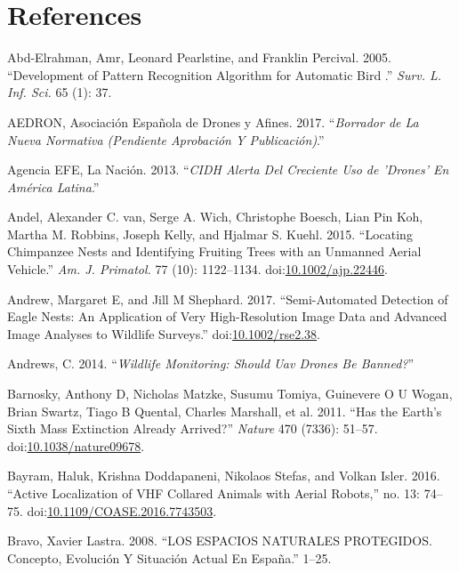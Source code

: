 \documentclass[]{interact}
\theoremstyle{plain}%
\theoremstyle{definition}
\theoremstyle{remark}
\begin{document}
\section*{References}\label{references}

\hypertarget{refs}{}
\hypertarget{ref-abd-elrahman_development_2005}{}
Abd-Elrahman, Amr, Leonard Pearlstine, and Franklin Percival. 2005.
``Development of Pattern Recognition Algorithm for Automatic Bird .''
\emph{Surv. L. Inf. Sci.} 65 (1): 37.

\hypertarget{ref-Aedron2017}{}
AEDRON, Asociación Española de Drones y Afines. 2017. ``\emph{Borrador
de La Nueva Normativa (Pendiente Aprobación Y Publicación)}.''

\hypertarget{ref-Nacion2013}{}
Agencia EFE, La Nación. 2013. ``\emph{CIDH Alerta Del Creciente Uso de
'Drones' En América Latina}.''

\hypertarget{ref-van_andel_locating_2015}{}
Andel, Alexander C. van, Serge A. Wich, Christophe Boesch, Lian Pin Koh,
Martha M. Robbins, Joseph Kelly, and Hjalmar S. Kuehl. 2015. ``Locating
Chimpanzee Nests and Identifying Fruiting Trees with an Unmanned Aerial
Vehicle.'' \emph{Am. J. Primatol.} 77 (10): 1122--1134.
doi:\href{https://doi.org/10.1002/ajp.22446}{10.1002/ajp.22446}.

\hypertarget{ref-andrew_semi-automated_2017}{}
Andrew, Margaret E, and Jill M Shephard. 2017. ``Semi-Automated
Detection of Eagle Nests: An Application of Very High-Resolution Image
Data and Advanced Image Analyses to Wildlife Surveys.''
doi:\href{https://doi.org/10.1002/rse2.38}{10.1002/rse2.38}.

\hypertarget{ref-Andrews2014}{}
Andrews, C. 2014. ``\emph{Wildlife Monitoring: Should Uav Drones Be
Banned?}''

\hypertarget{ref-barnosky_has_2011}{}
Barnosky, Anthony D, Nicholas Matzke, Susumu Tomiya, Guinevere O U
Wogan, Brian Swartz, Tiago B Quental, Charles Marshall, et al. 2011.
``Has the Earth's Sixth Mass Extinction Already Arrived?'' \emph{Nature}
470 (7336): 51--57.
doi:\href{https://doi.org/10.1038/nature09678}{10.1038/nature09678}.

\hypertarget{ref-bayram_active_2016}{}
Bayram, Haluk, Krishna Doddapaneni, Nikolaos Stefas, and Volkan Isler.
2016. ``Active Localization of VHF Collared Animals with Aerial
Robots,'' no. 13: 74--75.
doi:\href{https://doi.org/10.1109/COASE.2016.7743503}{10.1109/COASE.2016.7743503}.

\hypertarget{ref-bravo_espacios_2008}{}
Bravo, Xavier Lastra. 2008. ``LOS ESPACIOS NATURALES PROTEGIDOS.
Concepto, Evolución Y Situación Actual En España.'' 1--25.
\end{document}
